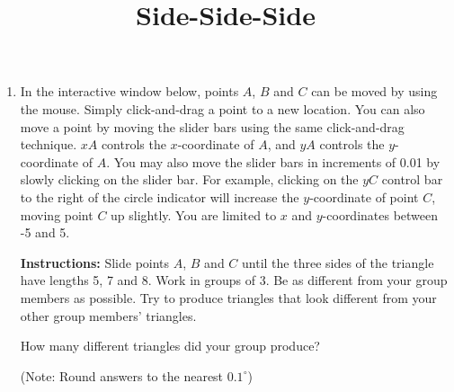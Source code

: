 \documentclass{ximera}
\title{Side-Side-Side}
\begin{document}
\begin{abstract}
\end{abstract}
\maketitle

\begin{enumerate}

\item In the interactive window below, points $A$, $B$ and $C$ can be moved by using the mouse. Simply click-and-drag a point to a new location. You can also move a point by moving the slider bars using the same click-and-drag technique. $xA$ controls the $x$-coordinate of $A$, and $yA$ controls the $y$-coordinate of $A$. You may also move the slider bars in increments of 0.01 by slowly clicking on the slider bar. For example, clicking on the $yC$ control bar to the right of the circle indicator will increase the $y$-coordinate of point $C$, moving point $C$ up slightly. You are limited to $x$ and $y$-coordinates between -5 and 5. 

{\bf {Instructions:}} Slide points $A$, $B$ and $C$ until the three sides of the triangle have lengths 5, 7 and 8. Work in groups of 3. Be as different from your group members as possible. Try to produce triangles that look different from your other group members' triangles.



\begin{question}
How many different triangles did your group produce?
\begin{multipleChoice}
\end{multipleChoice}
\begin{question}
(Note: Round answers to the nearest $0.1^\circ$)


\end{question}
\end{question}
\end{enumerate}
\end{document}
